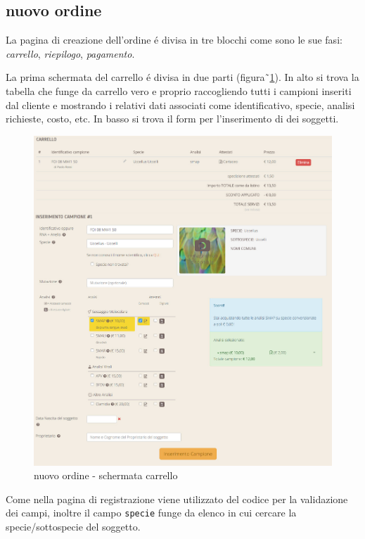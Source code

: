 \subsection*{nuovo ordine}
\label{subs:pno}
La pagina di creazione dell'ordine é divisa in tre blocchi come sono le sue fasi: \emph{carrello}, \emph{riepilogo}, \emph{pagamento}.

La prima schermata del carrello é divisa in due parti (figura˜\ref{fig:pno-cart}). In alto si trova la tabella che funge da carrello vero e proprio raccogliendo tutti i campioni inseriti dal cliente e mostrando i relativi dati associati come identificativo, specie, analisi richieste, costo, etc. In basso si trova il form per l'inserimento di dei soggetti.

\begin{figure}
 \includegraphics[width=1\textwidth]{images/pno-cart} 
 \caption{nuovo ordine - schermata carrello}
 \label{fig:pno-cart}
\end{figure}

Come nella pagina di registrazione viene utilizzato del codice {\js} per la validazione dei campi, inoltre il campo \texttt{specie} funge da elenco in cui cercare la specie/sottospecie del soggetto. 


